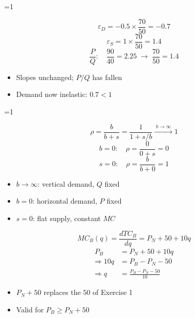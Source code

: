 \documentclass{beamer}
\newcommand{\showanswers}{0}
\begin{document}
\ifnum\showanswers=1
\begin{frame}[plain,label=w2_ans_q23a]
  \Large
  \[
    \tag{M28}\;\varepsilon_D = -0.5 \times \frac{70}{50} = -0.7
  \]
  \[
    \tag{M29}\;\varepsilon_S = 1 \times \frac{70}{50} = 1.4
  \]
  \[
    \tag{M30}\;\frac{P}{Q}: \quad \frac{90}{40} = 2.25 \;\longrightarrow\; \frac{70}{50} = 1.4
  \]

  \vspace{0.3em}
  \begin{itemize}\Large
    \item Slopes unchanged; $P/Q$ has fallen
    \item Demand now inelastic: $0.7 < 1$
  \end{itemize}
\end{frame}
\fi

\ifnum\showanswers=1
\begin{frame}[plain,label=w2_ans_q23c]
  \Large
  \[
    \tag{M31}\;\rho = \frac{b}{b + s} = \frac{1}{1 + s/b} \xrightarrow{\;b \to \infty\;} 1
  \]
  \[
    \tag{M32}\;b = 0: \quad \rho = \frac{0}{0 + s} = 0
  \]
  \[
    \tag{M33}\;s = 0: \quad \rho = \frac{b}{b + 0} = 1
  \]

  \vspace{0.3em}
  \begin{itemize}\Large
    \item $b \to \infty$: vertical demand, $Q$ fixed
    \item $b = 0$: horizontal demand, $P$ fixed
    \item $s = 0$: flat supply, constant $MC$
  \end{itemize}
\end{frame}
\fi

\begin{frame}[plain,label=w2_wt5_firm]
  \Large
  \[
    \tag{14}\;MC_B(q) = \frac{dTC_B}{dq} = P_N + 50 + 10q
  \]
  \begin{align*}
    \tag{15}\;P_B &= P_N + 50 + 10q\\
    \Rightarrow 10q &= P_B - P_N - 50\\
    \Rightarrow q &= \frac{P_B - P_N - 50}{10}
  \end{align*}

  \vspace{0.3em}
  \begin{itemize}\Large
    \item $P_N + 50$ replaces the $50$ of Exercise 1
    \item Valid for $P_B \ge P_N + 50$
  \end{itemize}
\end{frame}
\end{document}
